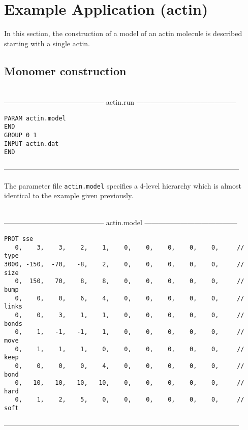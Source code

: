 \section{Example Application (actin)}


In this section, the construction of a model of an actin molecule is described
starting with a single actin.

\subsection{Monomer construction}

\begin{singlespace}
\ \\
------------------------------------------
actin.run
------------------------------------------
\begin{verbatim}
PARAM actin.model
END
GROUP 0 1
INPUT actin.dat
END
\end{verbatim}
---------------------------------------------------------------------------------------------------
\end{singlespace}

The parameter file {\tt actin.model} specifies a 4-level hierarchy which is almost identical to
the example given previously.

\begin{singlespace}
\ \\
------------------------------------------
actin.model
---------------------------------------
\begin{footnotesize}
\begin{verbatim}
PROT sse 
   0,    3,    3,    2,    1,    0,    0,    0,    0,    0,  	// type
3000, -150,  -70,   -8,    2,    0,    0,    0,    0,    0,  	// size
   0,  150,   70,    8,    8,    0,    0,    0,    0,    0,  	// bump
   0,    0,    0,    6,    4,    0,    0,    0,    0,    0,  	// links
   0,    0,    3,    1,    1,    0,    0,    0,    0,    0,  	// bonds
   0,    1,   -1,   -1,    1,    0,    0,    0,    0,    0,  	// move
   0,    1,    1,    1,    0,    0,    0,    0,    0,    0,  	// keep
   0,    0,    0,    0,    4,    0,    0,    0,    0,    0,  	// bond 
   0,   10,   10,   10,   10,    0,    0,    0,    0,    0,  	// hard
   0,    1,    2,    5,    0,    0,    0,    0,    0,    0,  	// soft
\end{verbatim}
\end{footnotesize}
---------------------------------------------------------------------------------------------------
\end{singlespace}


